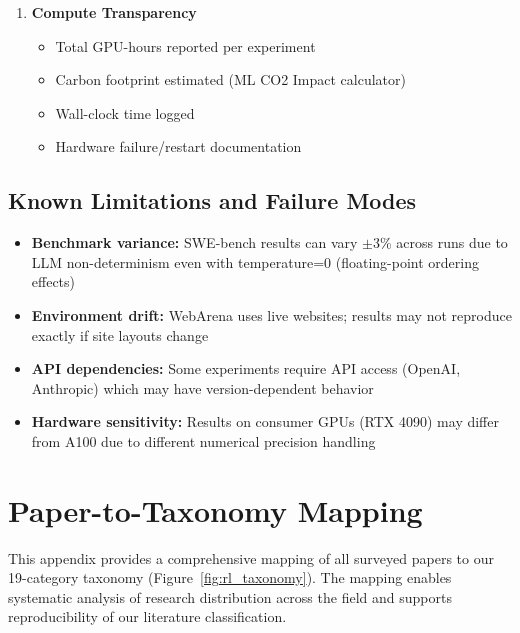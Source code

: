 \documentclass[12pt,a4paper]{report}
\theoremstyle{definition}
\begin{document}
\begin{enumerate}[leftmargin=*]
    \item \textbf{Compute Transparency}
    \begin{itemize}[nosep]
        \item[$\square$] Total GPU-hours reported per experiment
        \item[$\square$] Carbon footprint estimated (ML CO2 Impact calculator)
        \item[$\square$] Wall-clock time logged
        \item[$\square$] Hardware failure/restart documentation
    \end{itemize}
\end{enumerate}

\section*{Known Limitations and Failure Modes}

\begin{itemize}
    \item \textbf{Benchmark variance:} SWE-bench results can vary $\pm$3\% across runs due to LLM non-determinism even with temperature=0 (floating-point ordering effects)
    \item \textbf{Environment drift:} WebArena uses live websites; results may not reproduce exactly if site layouts change
    \item \textbf{API dependencies:} Some experiments require API access (OpenAI, Anthropic) which may have version-dependent behavior
    \item \textbf{Hardware sensitivity:} Results on consumer GPUs (RTX 4090) may differ from A100 due to different numerical precision handling
\end{itemize}



\chapter{Paper-to-Taxonomy Mapping}
\label{app:paper_mapping}

This appendix provides a comprehensive mapping of all surveyed papers to our 19-category taxonomy (Figure~\ref{fig:rl_taxonomy}). The mapping enables systematic analysis of research distribution across the field and supports reproducibility of our literature classification.
\end{document}
